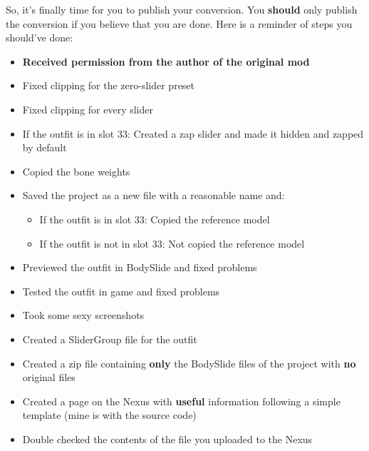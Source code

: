 So, it's finally time for you to publish your conversion. You \textbf{should} only publish the conversion if you believe 
that you are done. Here is a reminder of steps you should've done:
\begin{itemize}
    \item \textbf{Received permission from the author of the original mod}
    \item Fixed clipping for the zero-slider preset
    \item Fixed clipping for every slider
    \item If the outfit is in slot 33: Created a zap slider and made it hidden and zapped by default
    \item Copied the bone weights
    \item Saved the project as a new file with a reasonable name and:
    \begin{itemize}
        \item If the outfit is in slot 33: Copied the reference model
        \item If the outfit is not in slot 33: Not copied the reference model
    \end{itemize}
    \item Previewed the outfit in BodySlide and fixed problems
    \item Tested the outfit in game and fixed problems
    \item Took some sexy screenshots
    \item Created a SliderGroup file for the outfit
    \item Created a zip file containing \textbf{only} the BodySlide files of the project with \textbf{no} original files
    \item Created a page on the Nexus with \textbf{useful} information following a simple template (mine is with the source code)
    \item Double checked the contents of the file you uploaded to the Nexus
\end{itemize}